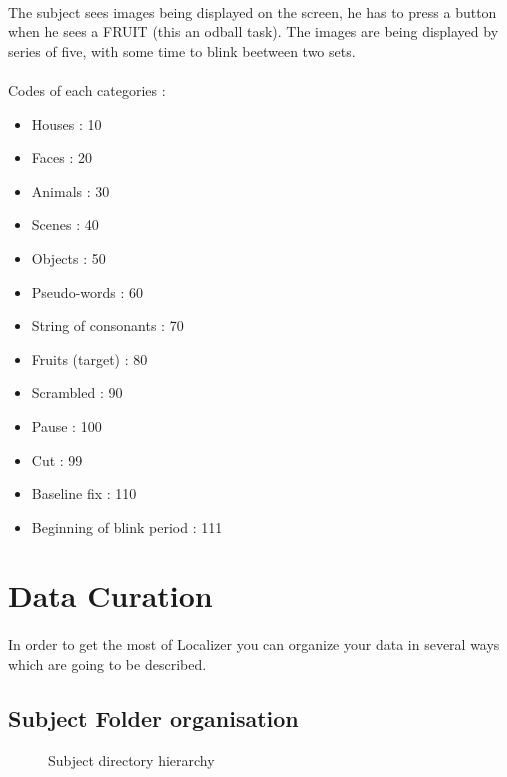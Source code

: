 \documentclass[a4paper]{article}
\begin{document}
\paragraph{} The subject sees images being displayed on the screen, he has to press a button when he sees a FRUIT (this an odball task). The images are being displayed by series of five, with some time to blink beetween two sets.
\paragraph{}
Codes of each categories :

\begin{itemize}
\item Houses : 10
\item Faces : 20
\item Animals : 30
\item Scenes : 40
\item Objects : 50
\item Pseudo-words : 60
\item String of consonants : 70
\item Fruits (target) : 80
\item Scrambled : 90
\item Pause : 100
\item Cut : 99
\item Baseline fix : 110
\item Beginning of blink period : 111
\end{itemize}

\newpage
\section{Data Curation} \label{curation}    
\paragraph{} In order to get the most of Localizer you can organize your data in several ways which are going to be described.
\subsection{Subject Folder organisation} \label{subjectfolderorganisation}   
\begin{figure}[H]
\caption{\label{SubjectDirectory}Subject directory hierarchy}
\end{figure}
\end{document}
